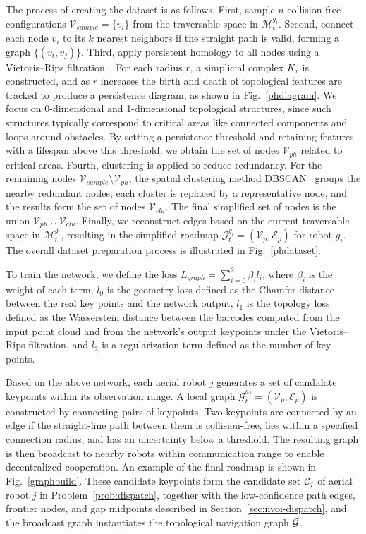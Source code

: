 The process of creating the dataset is as follows. First, sample $n$ collision-free configurations $\mathcal{V}_{sample} = \{v_i\}$ from the traversable space in $\mathcal{M}^{g_i}_t$. Second, connect each node $v_i$ to its $k$ nearest neighbors if the straight path is valid, forming a graph $\{(v_i, v_j)\}$. Third, apply persistent homology to all nodes using a Vietoris--Rips filtration~\cite{otter2017roadmap}. For each radius $r$, a simplicial complex $K_r$ is constructed, and as $r$ increases the birth and death of topological features are tracked to produce a persistence diagram, as shown in Fig.~\ref{phdiagram}. We focus on 0-dimensional and 1-dimensional topological structures, since such structures typically correspond to critical areas like connected components and loops around obstacles. By setting a persistence threshold and retaining features with a lifespan above this threshold, we obtain the set of nodes $\mathcal{V}_{ph}$ related to critical areas. Fourth, clustering is applied to reduce redundancy. For the remaining nodes $\mathcal{V}_{sample} \setminus \mathcal{V}_{ph}$, the spatial clustering method DBSCAN~\cite{ester1996density} groups the nearby redundant nodes, each cluster is replaced by a representative node, and the results form the set of nodes $\mathcal{V}_{clu}$. The final simplified set of nodes is the union $\mathcal{V}_{ph} \cup \mathcal{V}_{clu}$. Finally, we reconstruct edges based on the current traversable space in $\mathcal{M}^{g_i}_t$, resulting in the simplified roadmap $\mathcal{G}^{g_i}_t = (\mathcal{V}_p, \mathcal{E}_p)$ for robot $g_i$. The overall dataset preparation process is illustrated in Fig.~\ref{phdataset}.

To train the network, we define the loss $L_{graph} = \sum_{i=0}^{2} \beta_i l_i$, where $\beta_i$ is the weight of each term, $l_0$ is the geometry loss defined as the Chamfer distance between the real key points and the network output, $l_1$ is the topology loss defined as the Wasserstein distance between the barcodes computed from the input point cloud and from the network's output keypoints under the Vietoris--Rips filtration, and $l_2$ is a regularization term defined as the number of key points.

Based on the above network, each aerial robot $j$ generates a set of candidate keypoints within its observation range. A local graph $\mathcal{G}^{a_j}_t = (\mathcal{V}_p, \mathcal{E}_p)$ is constructed by connecting pairs of keypoints. Two keypoints are connected by an edge if the straight-line path between them is collision-free, lies within a specified connection radius, and has an uncertainty below a threshold. The resulting graph is then broadcast to nearby robots within communication range to enable decentralized cooperation. An example of the final roadmap is shown in Fig.~\ref{graphbuild}. These candidate keypoints form the candidate set $\mathcal{C}_j$ of aerial robot $j$ in Problem~\ref{prob:dispatch}, together with the low-confidence path edges, frontier nodes, and gap midpoints described in Section~\ref{sec:nvoi-dispatch}, and the broadcast graph instantiates the topological navigation graph $\mathcal{G}$.

